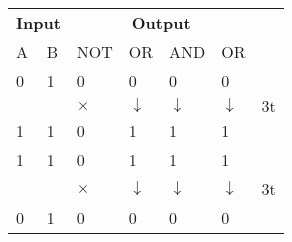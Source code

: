 \begin{enumerate}
\begin{answer}$\left. \right. $
\begin{table}[H]
	\centering
	\renewcommand*{\arraystretch}{1.2}
	\begin{tabular}{|p{1.5cm} p{1.5cm}|p{1.5cm}|p{1.5cm} |p{1.5cm}|p{1.5cm}|p{1.5cm}}
		\cline{1-6}
		\multicolumn{2}{|c|}{\textbf{Input }}&\multicolumn{4}{c|}{\textbf{Output }} & \\\cline{1-6}
		A&B&NOT & OR&AND&OR & \multirow{5}{*}{3t}\\\cline{1-6}
		0&1&0&0 & 0&0&\\
		& &$\times$&$\downarrow$ & $\downarrow$&$\downarrow$&\\ 
		1&1&0&1 & 1&1&\\ \cline{1-6}
		1&1&0&1 & 1&1&\\
		& &$\times$&$\downarrow$ & $\downarrow$&$\downarrow$&3t\\ 
		0&1&0&0 & 0&0&\\ \cline{1-6}
		

\end{tabular}
\end{table}
\end{answer}
\end{enumerate}
